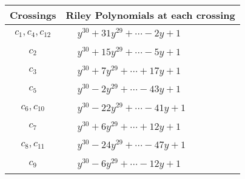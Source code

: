 \documentclass[1p]{elsarticle_modified}
\theoremstyle{definition}
\begin{document}
\begin{tabular}{m{50pt}|m{274pt}}
Crossings & \hspace{64pt}Riley Polynomials at each crossing \\
\hline $$\begin{aligned}c_{1},c_{4},c_{12}\end{aligned}$$&$\begin{aligned}
&y^{30}+31 y^{29}+\cdots-2 y+1
\end{aligned}$\\
\hline $$\begin{aligned}c_{2}\end{aligned}$$&$\begin{aligned}
&y^{30}+15 y^{29}+\cdots-5 y+1
\end{aligned}$\\
\hline $$\begin{aligned}c_{3}\end{aligned}$$&$\begin{aligned}
&y^{30}+7 y^{29}+\cdots+17 y+1
\end{aligned}$\\
\hline $$\begin{aligned}c_{5}\end{aligned}$$&$\begin{aligned}
&y^{30}-2 y^{29}+\cdots-43 y+1
\end{aligned}$\\
\hline $$\begin{aligned}c_{6},c_{10}\end{aligned}$$&$\begin{aligned}
&y^{30}-22 y^{29}+\cdots-41 y+1
\end{aligned}$\\
\hline $$\begin{aligned}c_{7}\end{aligned}$$&$\begin{aligned}
&y^{30}+6 y^{29}+\cdots+12 y+1
\end{aligned}$\\
\hline $$\begin{aligned}c_{8},c_{11}\end{aligned}$$&$\begin{aligned}
&y^{30}-24 y^{29}+\cdots-47 y+1
\end{aligned}$\\
\hline $$\begin{aligned}c_{9}\end{aligned}$$&$\begin{aligned}
&y^{30}-6 y^{29}+\cdots-12 y+1
\end{aligned}$\\
\hline
\end{tabular}\\~\\
\end{document}
